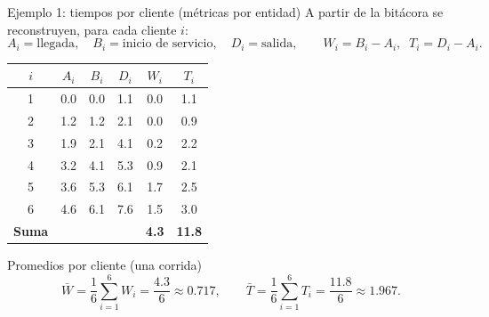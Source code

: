 \documentclass[aspectratio=1610, 9pt]{beamer}
\begin{document}

\begin{frame}{Ejemplo 1: tiempos por cliente (métricas por entidad)}
\small
A partir de la bitácora se reconstruyen, para cada cliente $i$:
\[
A_i=\text{llegada},\quad B_i=\text{inicio de servicio},\quad D_i=\text{salida},\qquad
W_i=B_i-A_i,\;\; T_i=D_i-A_i.
\]

\tiny
\setlength{\tabcolsep}{3.2pt}
\renewcommand{\arraystretch}{1.15}
\begin{table}
\centering
\begin{tabular}{@{}c c c c c c@{}}
\toprule
$i$ & $A_i$ & $B_i$ & $D_i$ & $W_i$ & $T_i$ \\
\midrule
1 & 0.0 & 0.0 & 1.1 & 0.0 & 1.1 \\
2 & 1.2 & 1.2 & 2.1 & 0.0 & 0.9 \\
3 & 1.9 & 2.1 & 4.1 & 0.2 & 2.2 \\
4 & 3.2 & 4.1 & 5.3 & 0.9 & 2.1 \\
5 & 3.6 & 5.3 & 6.1 & 1.7 & 2.5 \\
6 & 4.6 & 6.1 & 7.6 & 1.5 & 3.0 \\
\midrule
\textbf{Suma} &  &  &  & \textbf{4.3} & \textbf{11.8}\\
\bottomrule
\end{tabular}
\end{table}

\scriptsize
\begin{block}{Promedios por cliente (una corrida)}
\[
\bar W=\frac{1}{6}\sum_{i=1}^6 W_i=\frac{4.3}{6}\approx 0.717,
\qquad
\bar T=\frac{1}{6}\sum_{i=1}^6 T_i=\frac{11.8}{6}\approx 1.967.
\]
\end{block}
\end{frame}
\end{document}

